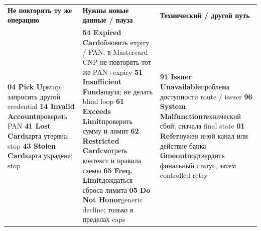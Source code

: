 \scriptsize
\renewcommand{\arraystretch}{1.22}

\begin{tabularx}{19.7cm}{
  >{\raggedright\arraybackslash}p{6.25cm}
  >{\raggedright\arraybackslash}p{6.25cm}
  >{\raggedright\arraybackslash}p{6.25cm}
}
\cellcolor{Bad!16}\textbf{Не повторять ту же операцию} &
\cellcolor{Warn!18}\textbf{Нужны новые данные / пауза} &
\cellcolor{AccentA!14}\textbf{Технический / другой путь} \\

\cellcolor{Bad!4}\textbf{04 Pick Up}\newline stop; запросить другой credential
\newline\textbf{14 Invalid Account}\newline проверить PAN
\newline\textbf{41 Lost Card}\newline карта утеряна; stop
\newline\textbf{43 Stolen Card}\newline карта украдена; stop &
\cellcolor{Warn!5}\textbf{54 Expired Card}\newline обновить expiry / PAN; в Mastercard CNP не повторять тот же PAN+expiry
\newline\textbf{51 Insufficient Funds}\newline пауза; не делать blind loop
\newline\textbf{61 Exceeds Limit}\newline проверить сумму и лимит
\newline\textbf{62 Restricted Card}\newline смотреть контекст и правила схемы
\newline\textbf{65 Freq. Limit}\newline дождаться сброса лимита
\newline\textbf{05 Do Not Honor}\newline generic decline; только в пределах caps &
\cellcolor{AccentA!5}\textbf{91 Issuer Unavailable}\newline проблема доступности route / issuer
\newline\textbf{96 System Malfunction}\newline технический сбой; сначала final state
\newline\textbf{01 Refer}\newline нужен иной канал или действие банка
\newline\textbf{timeout}\newline подтвердить финальный статус, затем controlled retry \\
\end{tabularx}

\vspace{4mm}

